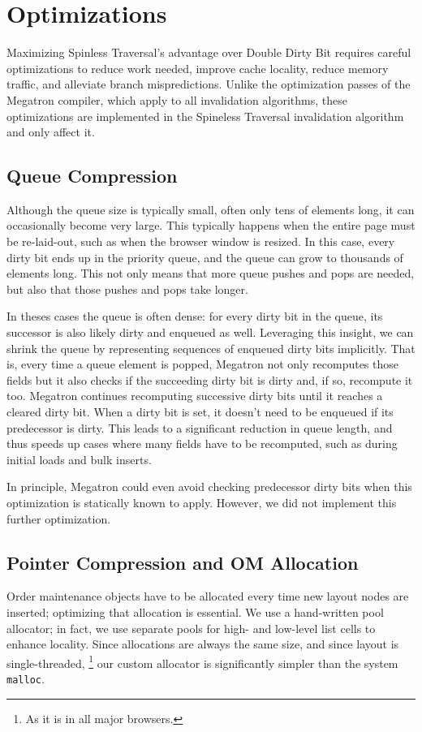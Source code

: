 \section{Optimizations}
\label{sec:opt}

Maximizing Spinless Traversal's advantage
  over Double Dirty Bit
  requires careful optimizations
  to reduce work needed, improve cache locality,
  reduce memory traffic,
  and alleviate branch mispredictions.
Unlike the optimization passes of the Megatron compiler,
  which apply to all invalidation algorithms,
  these optimizations are implemented
  in the Spineless Traversal invalidation algorithm
  and only affect it.

\subsection{Queue Compression}

Although the queue size is typically small, often only tens of elements long, it can occasionally become very large. This typically happens when the entire page must be re-laid-out, such as when the browser window is resized. In this case, every dirty bit ends up in the priority queue, and the queue can grow to thousands of elements long. This not only means that more queue pushes and pops are needed, but also that those pushes and pops take longer.

In theses cases the queue is often dense: for every dirty bit in the queue, its successor is also likely dirty and enqueued as well. Leveraging this insight, we can shrink the queue by representing sequences of enqueued dirty bits implicitly. That is, every time a queue element is popped, Megatron not only recomputes those fields but it also checks if the succeeding dirty bit is dirty and, if so, recompute it too. Megatron continues recomputing successive dirty bits until it reaches a cleared dirty bit. When a dirty bit is set, it doesn't need to be enqueued if its predecessor is dirty. This leads to a significant reduction in queue length, and thus speeds up cases where many fields have to be recomputed, such as during initial loads and bulk inserts.

In principle, Megatron could even avoid checking predecessor dirty bits when this optimization is statically known to apply. However, we did not implement this further optimization.

\subsection{Pointer Compression and OM Allocation}
Order maintenance objects have to be allocated every time
  new layout nodes are inserted;
  optimizing that allocation is essential.
We use a hand-written pool allocator;
  in fact, we use separate pools
  for high- and low-level list cells
  to enhance locality.
Since allocations are always the same size,
  and since layout is single-threaded,%
\footnote{As it is in all major browsers.}
  our custom allocator is significantly
  simpler than the system \texttt{malloc}.

